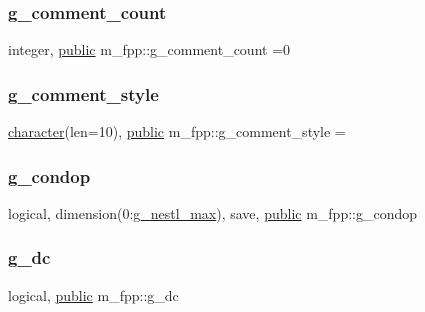 \subsubsection{\texorpdfstring{g\+\_\+comment\+\_\+count}{g\_comment\_count}}
{\footnotesize\ttfamily integer, \hyperlink{M__stopwatch_83_8txt_a2f74811300c361e53b430611a7d1769f}{public} m\+\_\+fpp\+::g\+\_\+comment\+\_\+count =0}

\mbox{\label{namespacem__fpp_affffb83550152a13f0592ef4b30496b8}} 
\subsubsection{\texorpdfstring{g\+\_\+comment\+\_\+style}{g\_comment\_style}}
{\footnotesize\ttfamily \hyperlink{option__stopwatch_83_8txt_abd4b21fbbd175834027b5224bfe97e66}{character}(len=10), \hyperlink{M__stopwatch_83_8txt_a2f74811300c361e53b430611a7d1769f}{public} m\+\_\+fpp\+::g\+\_\+comment\+\_\+style =\textquotesingle{} \textquotesingle{}}

\mbox{\label{namespacem__fpp_a380f6ad747fc050f112465e63a371e82}} 
\subsubsection{\texorpdfstring{g\+\_\+condop}{g\_condop}}
{\footnotesize\ttfamily logical, dimension(0\+:\hyperlink{namespacem__fpp_a8d8e200282a7bfd05dfd73337a7bf4e0}{g\+\_\+nestl\+\_\+max}), save, \hyperlink{M__stopwatch_83_8txt_a2f74811300c361e53b430611a7d1769f}{public} m\+\_\+fpp\+::g\+\_\+condop}

\mbox{\label{namespacem__fpp_a546a9c9d569439024e367632ee6db908}} 
\subsubsection{\texorpdfstring{g\+\_\+dc}{g\_dc}}
{\footnotesize\ttfamily logical, \hyperlink{M__stopwatch_83_8txt_a2f74811300c361e53b430611a7d1769f}{public} m\+\_\+fpp\+::g\+\_\+dc}

